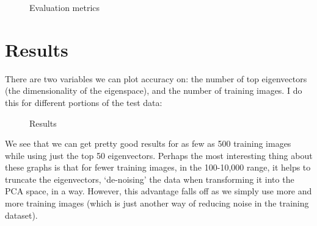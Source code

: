 \documentclass[11pt]{report}
\begin{document}
\begin{figure}[h]
  \centering
  \caption{Evaluation metrics}
  \label{fig:metrics}
\end{figure}

\section{Results}


There are two variables we can plot accuracy on: the number of top eigenvectors (the dimensionality of the eigenspace), and the number of training images. I do this for different portions of the test data:

\begin{figure}[h]
  \centering
  \caption{Results}
  \label{fig:results}
\end{figure}

We see that we can get pretty good results for as few as 500 training images while using just the top 50 eigenvectors. Perhaps the most interesting thing about these graphs is that for fewer training images, in the 100-10,000 range, it helps to truncate the eigenvectors, `de-noising' the data when transforming it into the PCA space, in a way. However, this advantage falls off as we simply use more and more training images (which is just another way of reducing noise in the training dataset).
\end{document}
